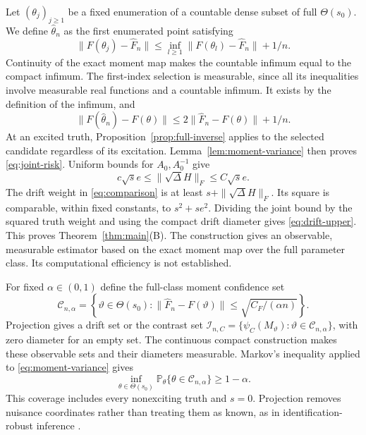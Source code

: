 \documentclass[11pt,a4paper]{amsart}
\theoremstyle{plain}
\theoremstyle{definition}
\theoremstyle{remark}
\newcommand{\PP}{\mathbb{P}}
\begin{document}
Let $(\theta_j)_{j\ge1}$ be a fixed enumeration of a countable
dense subset of full $\Theta(s_0)$. We define $\widehat\theta_n$ as the
first enumerated point satisfying
\begin{equation}\label{eq:MD}
 \|F(\theta_j)-\widehat F_n\|
 \le \inf_{l\ge1}\|F(\theta_l)-\widehat F_n\|+1/n.
\end{equation}
Continuity of the exact moment map makes the countable infimum equal to
the compact infimum. The first-index selection is measurable, since all
its inequalities involve measurable real functions and a countable
infimum. It exists by the definition of the infimum, and
\begin{equation}\label{eq:MD-error}
 \|F(\widehat\theta_n)-F(\theta)\|
 \le2\|\widehat F_n-F(\theta)\|+1/n.
\end{equation}
At an excited truth, Proposition~\ref{prop:full-inverse} applies to the selected
candidate regardless of its excitation. Lemma~\ref{lem:moment-variance} then proves
\eqref{eq:joint-risk}. Uniform bounds for $A_0,A_0^{-1}$ give
\begin{equation}\label{eq:H-scale}
 c\sqrt{s}e\le\|\sqrt\Delta H\|_F\le C\sqrt{s}e.
\end{equation}
The drift weight in \eqref{eq:comparison} is at least
$s+\|\sqrt\Delta H\|_F$. Its square is comparable, within fixed constants,
to $s^2+se^2$. Dividing the joint bound by the squared truth weight and
using the compact drift diameter gives \eqref{eq:drift-upper}. This proves
Theorem~\ref{thm:main}(B). The construction gives an observable, measurable
estimator based on the exact moment map over the full parameter class.
Its computational efficiency is not established.

For fixed $\alpha\in(0,1)$ define the full-class moment confidence set
\begin{equation}\label{eq:confidence-ball}
 \mathcal C_{n,\alpha}=\left\{\vartheta\in\Theta(s_0):
       \|\widehat F_n-F(\vartheta)\|
                        \le\sqrt{C_F/(\alpha n)}\right\}.
\end{equation}
Projection gives a drift set or the contrast set
$\mathcal I_{n,C}=\{\psi_C(M_\vartheta):\vartheta\in\mathcal C_{n,\alpha}\}$,
with zero diameter for an empty set. The continuous compact construction
makes these observable sets and their diameters measurable. Markov's
inequality applied to \eqref{eq:moment-variance} gives
\begin{equation}\label{eq:honesty}
 \inf_{\theta\in\Theta(s_0)}
 \PP_\theta\{\theta\in\mathcal C_{n,\alpha}\}\ge1-\alpha.
\end{equation}
This coverage includes every nonexciting truth and $s=0$. Projection
removes nuisance coordinates rather than treating them as known, as in
identification-robust inference \cite{AhsanDufour2024,ChengRenaultSangrey2024}.
\end{document}
